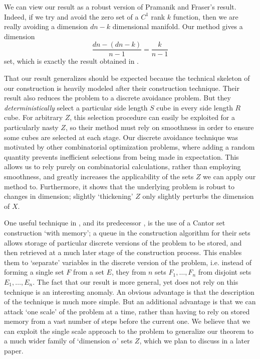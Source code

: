 \documentclass[dvipsnames,letterpaper,12pt]{article}
\theoremstyle{plain}
\begin{document}
We can view our result as a robust version of Pramanik and Fraser's result. Indeed, if we try and avoid the zero set of a $C^1$ rank $k$ function, then we are really avoiding a dimension $dn - k$ dimensional manifold. Our method gives a dimension
%
\[ \frac{dn - (dn - k)}{n - 1} = \frac{k}{n - 1} \]
%
set, which is exactly the result obtained in \cite{MalabikaRob}.

That our result generalizes \cite{MalabikaRob} should be expected because the technical skeleton of our construction is heavily modeled after their construction technique. Their result also reduces the problem to a discrete avoidance problem. But they {\it deterministically} select a particular side length $S$ cube in every side length $R$ cube. For arbitrary $Z$, this selection procedure can easily be exploited for a particularly nasty $Z$, so their method must rely on smoothness in order to ensure some cubes are selected at each stage. Our discrete avoidance technique was motivated by other combinatorial optimization problems, where adding a random quantity prevents inefficient selections from being made in expectation. This allows us to rely purely on combinatorial calculations, rather than employing smoothness, and greatly increases the applicability of the sets $Z$ we can apply our method to. Furthermore, it shows that the underlying problem is robust to changes in dimension; slightly `thickening' $Z$ only slightly perturbs the dimension of $X$.

One useful technique in \cite{MalabikaRob}, and its predecessor \cite{KeletiDimOneSet}, is the use of a Cantor set construction `with memory'; a queue in the construction algorithm for their sets allows storage of particular discrete versions of the problem to be stored, and then retrieved at a much later stage of the construction process. This enables them to `separate' variables in the discrete version of the problem, i.e. instead of forming a single set $F$ from a set $E$, they from $n$ sets $F_1, \dots, F_n$ from disjoint sets $E_1, \dots, E_n$. The fact that our result is more general, yet does not rely on this technique is an interesting anomaly. An obvious advantage is that the description of the technique is much more simple. But an additional advantage is that we can attack `one scale' of the problem at a time, rather than having to rely on stored memory from a vast number of steps before the current one. We believe that we can exploit the single scale approach to the problem to generalize our theorem to a much wider family of `dimension $\alpha$' sets $Z$, which we plan to discuss in a later paper.
\end{document}
